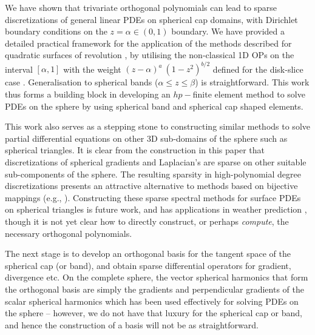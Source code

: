 \documentclass[11pt, oneside]{article}   	%
\begin{document}
We have shown that trivariate orthogonal polynomials can lead to sparse discretizations of general linear PDEs on spherical cap domains, with Dirichlet boundary conditions on the $z = \alpha \in (0,1)$ boundary. We have provided a detailed practical framework for the application of the methods described for quadratic surfaces of revolution \cite{olver2020orthogonal}, by utilising the non-classical 1D OPs on the interval $[\alpha, 1]$ with the weight $(z - \alpha)^a \: (1-z^2)^{b/2}$ defined for the disk-slice case \cite{snowball2019sparse}. Generalisation to spherical bands ($\alpha \leq z \leq \beta$) is straightforward.  This work thus forms a building block in developing an $hp-$finite element method to solve PDEs on the sphere by using spherical band and spherical cap shaped elements.

This work also serves as a stepping stone to constructing similar methods to solve partial differential equations on other 3D sub-domains of the sphere such as spherical triangles. It is clear from the construction in this paper that discretizations of spherical gradients and Laplacian's are sparse on other suitable sub-components of the sphere. The resulting sparsity in high-polynomial degree discretizations presents an attractive alternative to methods based on bijective mappings (e.g., \cite{DGShallowWater,FEMShallowWater,boyd2005sphere}). Constructing these sparse spectral methods for surface PDEs on  spherical triangles is future work, and has applications in weather prediction \cite{staniforth2012horizontal}, though it is not yet clear how to directly construct, or perhaps {\it compute}, the necessary orthogonal polynomials. 

The next stage is to develop an orthogonal basis for the tangent space of the spherical cap (or band), and obtain sparse differential operators for gradient, divergence etc. On the complete sphere, the vector spherical harmonics that form the orthogonal basis are simply the gradients and perpendicular gradients of the scalar spherical harmonics \cite{barrera1985vector} which has been used effectively for solving PDEs on the sphere \cite{vasil2019tensor,lecoanet2019tensor} -- however, we do not have that luxury for the spherical cap or band, and hence the construction of a basis will not be as straightforward.




\end{document}
